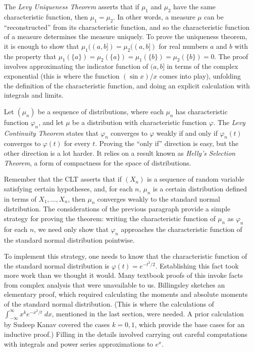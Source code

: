 \documentclass{article}
\newcommand{\ph}{\varphi}
\begin{document}
The \emph{Levy Uniqueness Theorem} asserts that if $\mu_1$ and $\mu_2$ have the same characteristic function, then $\mu_1 = \mu_2$. In other words, a measure $\mu$ can be ``reconstructed'' from its characteristic function, and so the characteristic function of a measure determines the measure uniquely. To prove the uniqueness theorem, it is enough to show that $\mu_1((a,b]) = \mu_2((a,b])$ for real numbers $a$ and $b$ with the property that $\mu_1(\{a\}) = \mu_2(\{a\}) = \mu_1(\{b\}) = \mu_2(\{b\}) = 0$. The proof involves approximating the indicator function of $(a,b]$ in terms of the complex exponential (this is where the function $(\sin x) / x$ comes into play), unfolding the definition of the characteristic function, and doing an explicit calculation with integrals and limits.

Let $(\mu_n)$ be a sequence of distributions, where each $\mu_n$ has characteristic function $\ph_n$, and let $\mu$ be a distribution with characteristic function $\ph$. The \emph{Levy Continuity Theorem} states that $\ph_n$ converges to $\ph$ weakly if and only if $\ph_n(t)$ converges to $\ph(t)$ for every $t$. Proving the ``only if'' direction is easy, but the other direction is a lot harder. It relies on a result known as \emph{Helly's Selection Theorem}, a form of compactness for the space of distributions.

Remember that the CLT asserts that if $(X_n)$ is a sequence of random variable satisfying certain hypotheses, and, for each $n$, $\mu_n$ is a certain distribution defined in terms of $X_1, \ldots, X_n$, then $\mu_n$ converges weakly to the standard normal distribution. The considerations of the previous paragraph provide a simple strategy for proving the theorem: writing the characteristic function of $\mu_n$ as $\ph_n$ for each $n$, we need only show that $\ph_n$ approaches the characteristic function of the standard normal distribution pointwise.

To implement this strategy, one needs to know that the characteristic function of the standard normal distribution is $\ph(t) = e^{-t^2/2}$. Establishing this fact took more work than we thought it would. Many textbook proofs of this invoke facts from complex analysis that were unavailable to us. Billingsley \cite[page 344]{billingsley:95} sketches an elementary proof, which required calculating the moments and absolute moments of the standard normal distribution. (This is where the calculations of $\int_{-\infty}^\infty x^k e^{-x^2 / t} \; dx$, mentioned in the last section, were needed. A prior calculation by Sudeep Kanav covered the cases $k = 0, 1$, which provide the base cases for an inductive proof.) Filling in the details involved carrying out careful computations with integrals and power series approximations to $e^x$.
\end{document}
